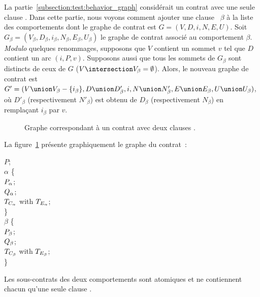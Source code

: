La partie~\ref{subsection:test:behavior_graph} considérait un contrat avec une
seule clause \abehavior. Dans cette partie, nous voyons comment ajouter une
clause \abehavior~$\beta$ à la liste des comportements dont le graphe de contrat
est $G = (V, D, i, N, E, U)$. Soit $G_\beta = (V_\beta, D_\beta, i_\beta,
N_\beta, E_\beta, U_\beta)$ le graphe de contrat associé au comportement
$\beta$. {\em Modulo} quelques renommages, supposons que $V$ contient un sommet
$v$ tel que $D$ contient un arc $(i, P, v)$. Supposons aussi que tous les
sommets de $G_\beta$ sont distincts de ceux de $G$ ($V \intersection V_\beta =
\emptyset$). Alors, le nouveau graphe de contrat est $G' = (V \union V_\beta -
\{i_\beta\}, D \union D'_\beta, i, N \union N'_\beta, E \union E_\beta, U \union
U_\beta)$, où $D'_\beta$ (respectivement $N'_\beta$) est obtenu de $D_\beta$
(respectivement $N_\beta$) en remplaçant $i_\beta$ par $v$.

\begin{figure}


\caption{\label{figure:test:graph_two_behaviors.tex} Graphe correspondant à
un contrat avec deux clauses \abehavior.}

\end{figure}

\begin{example}

La figure~\ref{figure:test:graph_two_behaviors.tex} présente graphiquement le
graphe du contrat~:
%
\begin{pre}
\arequires \(P\); \\
\abehavior \(\alpha\) \{ \\
    \arequires  \(P\sb{\alpha}\); \\
    \aensures   \(Q\sb{\alpha}\); \\
    \athrowable \(T\sb{C\sb{\alpha}}\) with \(T\sb{E\sb{\alpha}}\); \\
\} \\
\abehavior \(\beta\) \{ \\
    \arequires  \(P\sb{\beta}\); \\
    \aensures   \(Q\sb{\beta}\); \\
    \athrowable \(T\sb{C\sb{\beta}}\) with \(T\sb{E\sb{\beta}}\); \\
\}
\end{pre}
%
Les sous-contrats des deux comportements sont atomiques et ne contiennent chacun
qu'une seule clause \athrowable.

\end{example}

